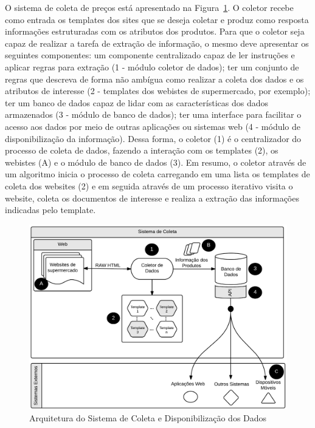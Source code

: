 O sistema de coleta de preços está apresentado na Figura~\ref{fig:01}. O coletor recebe como entrada os templates dos sites que se deseja coletar e produz como resposta informações estruturadas com os atributos dos produtos. Para que o coletor seja capaz de realizar a tarefa de extração de informação, o mesmo deve apresentar os seguintes componentes: um componente centralizado capaz de ler instruções e aplicar regras para extração (1 - módulo coletor de dados); ter um conjunto de regras que descreva de forma não ambígua como realizar a coleta dos dados e os atributos de interesse (2 - templates dos webistes de supermercado, por exemplo); ter um banco de dados capaz de lidar com as características dos dados armazenados (3 - módulo de banco de dados); ter uma interface para facilitar o acesso aos dados por meio de outras aplicações ou sistemas web (4 - módulo de disponibilização da informação). Dessa forma, o coletor (1) é o centralizador do processo de coleta de dados, fazendo a interação com os templates (2), os webistes (A) e o módulo de banco de dados (3). Em resumo, o coletor através de um algoritmo inicia o processo de coleta carregando em uma lista os templates de coleta dos websites (2) e em seguida através de um processo iterativo visita o website, coleta os documentos de interesse e realiza a extração das informações indicadas pelo template. 

\begin{figure}[htbp]
  \centering
  \includegraphics[width=\textwidth]{WebScraping}
  \caption[Figura Simples]{Arquitetura do Sistema de Coleta e Disponibilização dos Dados}
  \label{fig:01}
\end{figure}

